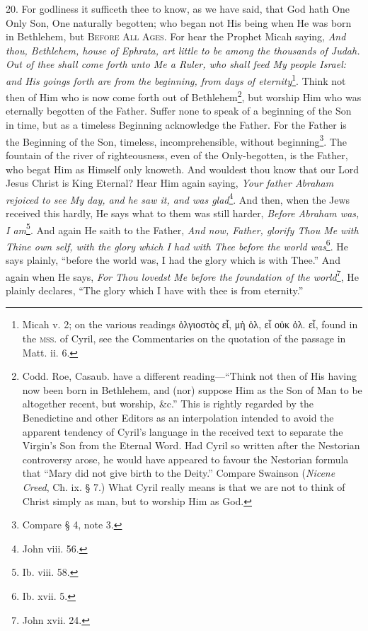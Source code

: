 20. For godliness it sufficeth thee to know, as we have said, that God hath One Only Son, One naturally begotten; who began not His being when He was born in Bethlehem, but \textsc{Before All Ages}. For hear the Prophet Micah saying, \emph{And thou, Bethlehem, house of Ephrata, art little to be among the thousands of Judah. Out of thee shall come forth unto Me a Ruler, who shall feed My people Israel: and His goings forth are from the beginning, from days of eternity}\footnote{Micah v. 2; on the various readings \textgreek{ὀλγιοστὸς εἶ, μὴ ὀλ, εἶ οὐκ ὀλ. εἶ}, found in the \textsc{mss.} of Cyril, see the Commentaries on the quotation of the passage in Matt. ii. 6.}. Think not then of Him who is now come forth out of Bethlehem\footnote{Codd. Roe, Casaub. have a different reading—“Think not then of His having now been born in Bethlehem, and (nor) suppose Him as the Son of Man to be altogether recent, but worship, \&c.” This is rightly regarded by the Benedictine and other Editors as an interpolation intended to avoid the apparent tendency of Cyril’s language in the received text to separate the Virgin’s Son from the Eternal Word. Had Cyril so written after the Nestorian controversy arose, he would have appeared to favour the Nestorian formula that “Mary did not give birth to the Deity.” Compare Swainson (\emph{Nicene Creed}, Ch. ix. § 7.) What Cyril really means is that we are not to think of Christ simply as man, but to worship Him as God.}, but worship Him who was eternally begotten of the Father. Suffer none to speak of a beginning of the Son in time, but as a timeless Beginning acknowledge the Father. For the Father is the Beginning of the Son, timeless, incomprehensible, without beginning\footnote{Compare § 4, note 3.}. The fountain of the river of righteousness, even of the Only-begotten, is the Father, who begat Him as Himself only knoweth. And wouldest thou know that our Lord Jesus Christ is King Eternal? Hear Him again saying, \emph{Your father Abraham rejoiced to see My day, and he saw it, and was glad}\footnote{John viii. 56.}. And then, when the Jews received this hardly, He says what to them was still harder, \emph{Before Abraham was, I am}\footnote{Ib. viii. 58.}. And again He saith to the Father, \emph{And now, Father, glorify Thou Me with Thine own self, with the glory which I had with Thee before the world was}\footnote{Ib. xvii. 5.}. He says plainly, “before the world was, I had the glory which is with Thee.” And again when He says, \emph{For Thou lovedst Me before the foundation of the world}\footnote{John xvii. 24.}, He plainly declares, “The glory which I have with thee is from eternity.”

